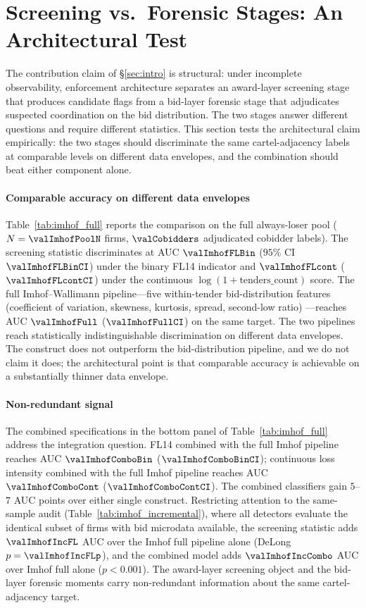 \section{Screening vs.~Forensic Stages: An Architectural Test}
\label{sec:forensic}

The contribution claim of §\ref{sec:intro} is structural: under
incomplete observability, enforcement architecture separates an
award-layer screening stage that produces candidate flags from a
bid-layer forensic stage that adjudicates suspected coordination
on the bid distribution. The two stages answer different
questions and require different statistics. This section tests
the architectural claim empirically: the two stages should
discriminate the same cartel-adjacency labels at comparable
levels on different data envelopes, and the combination should
beat either component alone.

\paragraph{Comparable accuracy on different data envelopes}
Table~\ref{tab:imhof_full} reports the comparison on the full
always-loser pool ($N = \valImhofPoolN$ firms, $\valCobidders$
adjudicated cobidder labels). The screening statistic
discriminates at AUC $\valImhofFLBin$ ($95\%$ CI
$\valImhofFLBinCI$) under the binary FL14 indicator and
$\valImhofFLcont$ ($\valImhofFLcontCI$) under the continuous
$\log(1+\text{tenders\_count})$ score. The full
Imhof--Wallimann pipeline---five within-tender bid-distribution
features (coefficient of variation, skewness, kurtosis, spread,
second-low ratio)
\citep{imhof2019detecting,wallimann2023machine}---reaches AUC
$\valImhofFull$ ($\valImhofFullCI$) on the same target. The
two pipelines reach statistically indistinguishable
discrimination on different data envelopes. The construct does
not outperform the bid-distribution pipeline, and we do not
claim it does; the architectural point is that comparable
accuracy is achievable on a substantially thinner data envelope.



\paragraph{Non-redundant signal} The combined specifications in
the bottom panel of Table~\ref{tab:imhof_full} address the
integration question. FL14 combined with the full Imhof
pipeline reaches AUC $\valImhofComboBin$ ($\valImhofComboBinCI$);
continuous loss intensity combined with the full Imhof pipeline
reaches AUC $\valImhofComboCont$ ($\valImhofComboContCI$). The
combined classifiers gain $5$--$7$ AUC points over either single
construct. Restricting attention to the same-sample audit
(Table~\ref{tab:imhof_incremental}), where all detectors
evaluate the identical subset of firms with bid microdata
available, the screening statistic adds $\valImhofIncFL$ AUC
over the Imhof full pipeline alone (DeLong $p = \valImhofIncFLp$),
and the combined model adds $\valImhofIncCombo$ AUC over Imhof
full alone ($p < 0.001$). The award-layer screening object and
the bid-layer forensic moments carry non-redundant information
about the same cartel-adjacency target.

